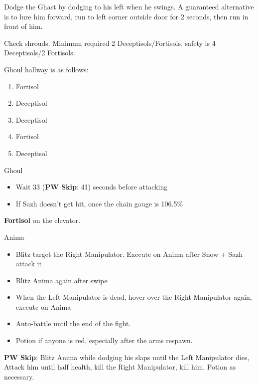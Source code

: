 \begin{multicols}{2}
Dodge the Ghast by dodging to his left when he swings. A guaranteed alternative is to lure him forward, run to left corner outside door for 2 seconds, then run in front of him.

Check shrouds. Minimum required 2 Deceptisols/Fortisols, safety is 4 Deceptisols/2 Fortisols.

Ghoul hallway is as follows:

\begin{enumerate}
    \item Fortisol
    \item Deceptisol
    \item Deceptisol
    \item Fortisol
    \item Deceptisol
\end{enumerate}

\begin{battle}{Ghoul}
\begin{itemize}
    \item Wait 33 ({\bf PW Skip}: 41) seconds before attacking
    \item If Sazh doesn't get hit, once the chain gauge is 106.5\%
\end{itemize}
\end{battle}

\textbf{Fortisol} on the elevator.

\begin{battle}{Anima}
\begin{itemize}
    \item Blitz target the Right Manipulator. Execute on Anima after Snow + Sazh attack it
    \item Blitz Anima again after swipe
    \item When the Left Manipulator is dead, hover over the Right Manipulator again, execute on Anima
    \item Auto-battle until the end of the fight.
    \item Potion if anyone is red, especially after the arms respawn.
\end{itemize}
 {\bf PW Skip}: Blitz Anima while dodging his slaps until the Left Manipulator dies, Attack him until half health, kill the Right Manipulator, kill him. Potion as necessary.
\end{battle}



\end{multicols}